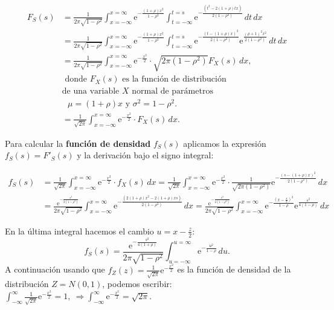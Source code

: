 \documentclass[]{book}
\begin{document}
\[
\begin{array}{rl}
F_S(s) 
& =  \displaystyle \frac{1}{2\pi\sqrt{1-\rho^2}} \int_{x=-\infty}^{x=\infty} \mathrm{e}^{-\frac{(1+\rho)x^2}{1-\rho^2}}\int_{t=-\infty}^{t=s} \mathrm{e}^{-\frac{(t^2-2(1+\rho) t x)}{2(1-\rho^2)}}\, dt\, dx \\
& = \frac{1}{2\pi\sqrt{1-\rho^2}} \int_{x=-\infty}^{x=\infty} \mathrm{e}^{-\frac{(1+\rho)x^2}{1-\rho^2}}\int_{t=-\infty}^{t=s} \mathrm{e}^{-\frac{(t-(1+\rho)x)^2}{2(1-\rho^2)}} \mathrm{e}^{\frac{(\rho+1)^2 x^2}{2(1-\rho^2)}}\, dt\, dx  \\
& = \frac{1}{2\pi\sqrt{1-\rho^2}} \int_{x=-\infty}^{x=\infty} \mathrm{e}^{-\frac{x^2}{2}}\cdot \sqrt{2\pi (1-\rho^2)} F_X(s)\, dx, \\ 
& \mbox{ donde $F_X(s)$ es la función de distribución}\\
& \mbox{de una variable $X$ normal de parámetros} \\ 
& \mbox{ $\mu =(1+\rho)x$ y $\sigma^2=1-\rho^2$.} \\ 
& = \frac{1}{\sqrt{2\pi}}\int_{x=-\infty}^{x=\infty} \mathrm{e}^{-\frac{x^2}{2}}\cdot F_X(s)\, dx.
\end{array}
\]

Para calcular la \textbf{función de densidad} \(f_S(s)\) aplicamos la expresión \(f_S(s)=F'_S(s)\) y la derivación bajo el signo integral:

\[
\begin{array}{rl}
f_S(s) & = \frac{1}{\sqrt{2\pi}}\int_{x=-\infty}^{x=\infty} \mathrm{e}^{-\frac{x^2}{2}}\cdot f_X(s)\, dx = \frac{1}{\sqrt{2\pi}}\int_{x=-\infty}^{x=\infty} \mathrm{e}^{-\frac{x^2}{2}}\cdot \frac{1}{\sqrt{2\pi (1-\rho^2)}}\mathrm{e}^{-\frac{(s-(1+\rho)x)^2}{2(1-\rho^2)}}\, dx \\ & = \frac{\mathrm{e}^{-\frac{s^2}{2(1-\rho^2)}}}{2\pi\sqrt{1-\rho^2}} \int_{x=-\infty}^{x=\infty} \mathrm{e}^{-\frac{(2(1+\rho) x^2-2(1+\rho)xs)}{2(1-\rho^2)}}\, dx= \frac{\mathrm{e}^{-\frac{s^2}{2(1-\rho^2)}}}{2\pi\sqrt{1-\rho^2}} \int_{x=-\infty}^{x=\infty} \mathrm{e}^{-\frac{\left(x-\frac{s}{2}\right)^2}{1-\rho}}\mathrm{e}^{\frac{s^2}{4(1-\rho)}}\, dx
\end{array}
\]

En la última integral hacemos el cambio \(u=x-\frac{z}{2}\):
\[
f_S(s)  =\frac{\mathrm{e}^{-\frac{s^2}{4(1+\rho)}}}{2\pi\sqrt{1-\rho^2}} \int_{u=-\infty}^{u=\infty} \mathrm{e}^{-\frac{u^2}{1-\rho}}\, du.
\]
A continuación usando que \(f_Z(z)=\frac{1}{\sqrt{2\pi}}\mathrm{e}^{-\frac{x^2}{2}}\) es la función de densidad de la distribución \(Z=N(0,1)\), podemos escribir: \(\int_{-\infty}^\infty \frac{1}{\sqrt{2\pi}}\mathrm{e}^{-\frac{x^2}{2}}=1,\ \Rightarrow \int_{-\infty}^\infty \mathrm{e}^{-\frac{x^2}{2}}=\sqrt{2\pi}.\)
\end{document}
